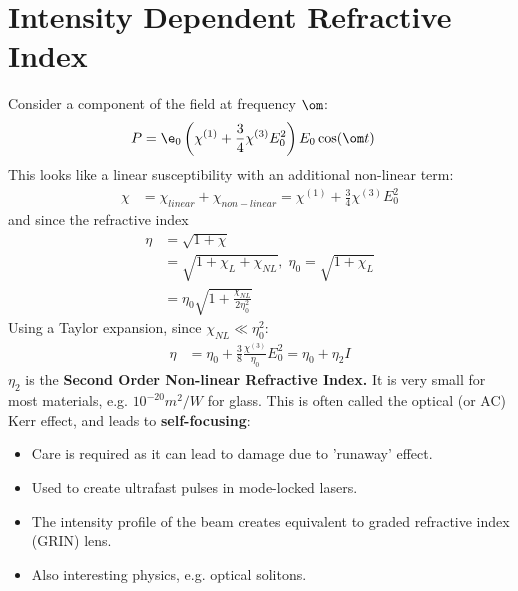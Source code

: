 \documentclass[a4paper, 11pt, normalem]{report}
\begin{document}
\section{Intensity Dependent Refractive Index}
Consider a component of the field at frequency $\om$:
\begin{align}
    P &= \e_0\left(\chi^{(1)}+\frac34\chi^{(3)}E_0^2\right)E_0\cos(\om t)
\end{align}
This looks like a linear susceptibility with an additional non-linear term:
\begin{align}
    \chi &= \chi_{linear} + \chi_{non-linear} = \chi^{(1)}+\frac34\chi^{(3)}E_0^2
\end{align}
and since the refractive index
\begin{align}
    \eta &= \sqrt{1+\chi} \\
         &= \sqrt{1+\chi_L+\chi_{NL}},\; \eta_0 = \sqrt{1+\chi_L} \\
         &= \eta_0\sqrt{1+\frac{\chi_{NL}}{2\eta_0^2}}
\end{align}
Using a Taylor expansion, since $\chi_{NL}\ll\eta_0^2$:
\begin{align}
    \eta &= \eta_0 + \frac38\frac{\chi^{(3)}}{\eta_0}E_0^2 = \eta_0 + \eta_2I
\end{align}
$\eta_2$ is the \textbf{Second Order Non-linear Refractive Index.}
It is very small for most materials, e.g. $10^{-20} m^2/W$ for glass.
This is often called the optical (or AC) Kerr effect, and leads to \textbf{self-focusing}:
\begin{figure}[H]
    \centering
\end{figure}
\begin{itemize}
    \item Care is required as it can lead to damage due to 'runaway' effect.
    \item Used to create ultrafast pulses in mode-locked lasers.
    \item The intensity profile of the beam creates equivalent to graded refractive index (GRIN) lens.
    \item Also interesting physics, e.g. optical solitons.
\end{itemize}

% 
\end{document}
